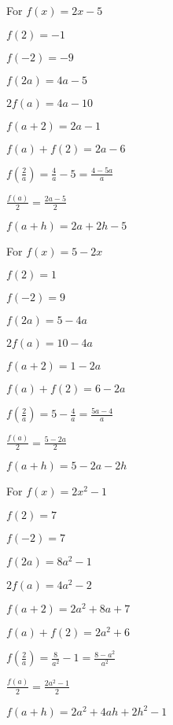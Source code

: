 \begin{exenum}
\item For $f(x) = 2x-5$

\begin{shortitemize}
\item  $f(2) = -1$
\item  $f(-2) = -9$
\item  $f(2a) = 4a-5$
\item  $2 f(a) = 4a-10$
\item $f(a+2) = 2a-1$
\item $f(a) + f(2) = 2a-6$
\item  $f \left( \frac{2}{a} \right) = \frac{4}{a} - 5 = \frac{4-5a}{a}$
\item $\frac{f(a)}{2} =\frac{2a-5}{2}$
\item  $f(a + h) = 2a + 2h - 5$
\end{shortitemize}

\item For $f(x) = 5-2x$

\begin{shortitemize}
\item  $f(2) = 1$
\item  $f(-2) = 9$
\item  $f(2a) = 5-4a$
\item  $2 f(a) = 10-4a$
\item $f(a+2) = 1-2a$
\item $f(a) + f(2) = 6-2a$
\item  $f \left( \frac{2}{a} \right) = 5 - \frac{4}{a} = \frac{5a-4}{a}$
\item $\frac{f(a)}{2} = \frac{5-2a}{2}$
\item  $f(a + h) = 5-2a-2h$
\end{shortitemize}

\item For $f(x) = 2x^2-1$

\begin{shortitemize}
\item $f(2) = 7$
\item $f(-2) = 7$
\item $f(2a) = 8a^2-1$
\item $2 f(a) = 4a^2-2$
\item $f(a+2) = 2a^2+8a+7$
\item $f(a) + f(2) = 2a^2+6$
\item $f \left( \frac{2}{a} \right) = \frac{8}{a^2} - 1 = \frac{8-a^2}{a^2}$
\item $\frac{f(a)}{2} =  \frac{2a^2-1}{2}$
\item $f(a + h) = 2a^2+4ah+2h^2-1$
\end{shortitemize}


\end{exenum}
